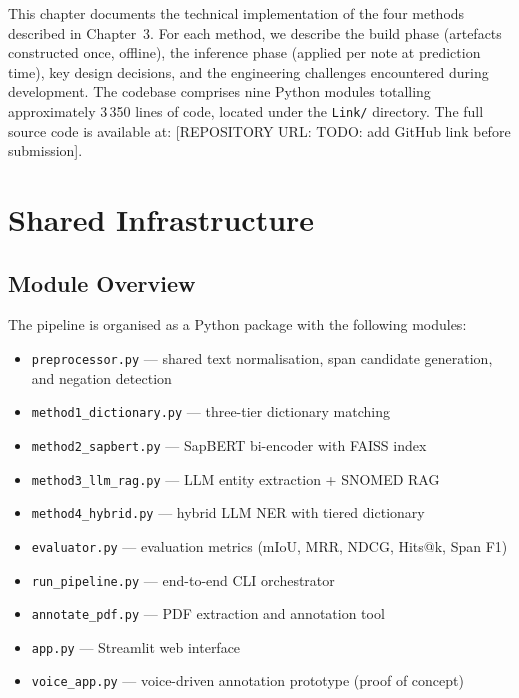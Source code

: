 
This chapter documents the technical implementation of the four methods described in Chapter~3. For each method, we describe the build phase (artefacts constructed once, offline), the inference phase (applied per note at prediction time), key design decisions, and the engineering challenges encountered during development. The codebase comprises nine Python modules totalling approximately 3\,350 lines of code, located under the \texttt{Link/} directory. The full source code is available at: [REPOSITORY URL: TODO: add GitHub link before submission]. %

\section{Shared Infrastructure}

\subsection{Module Overview}

The pipeline is organised as a Python package with the following modules:

\begin{itemize}
    \item \texttt{preprocessor.py} — shared text normalisation, span candidate generation, and negation detection
    \item \texttt{method1\_dictionary.py} — three-tier dictionary matching
    \item \texttt{method2\_sapbert.py} — SapBERT bi-encoder with FAISS index
    \item \texttt{method3\_llm\_rag.py} — LLM entity extraction + SNOMED RAG
    \item \texttt{method4\_hybrid.py} — hybrid LLM NER with tiered dictionary
    \item \texttt{evaluator.py} — evaluation metrics (mIoU, MRR, NDCG, Hits@k, Span F1)
    \item \texttt{run\_pipeline.py} — end-to-end CLI orchestrator
    \item \texttt{annotate\_pdf.py} — PDF extraction and annotation tool
    \item \texttt{app.py} — Streamlit web interface
    \item \texttt{voice\_app.py} — voice-driven annotation prototype (proof of concept)
\end{itemize}

